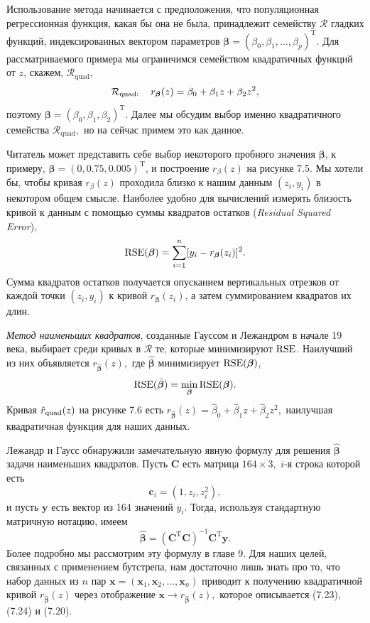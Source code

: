 Использование метода начинается с предположения, что популяционная регрессионная функция, какая бы она не была, принадлежит семейству $\mathcal R$ гладких функций, индексированных вектором параметров $\bm \beta = (\beta_0,\beta_1,\ldots,\beta_p)^\mathrm{T}$. Для рассматриваемого примера мы ограничимся семейством квадратичных функций от $z$, скажем, $\mathcal R_\text{quad},$
\begin{equation}
  \mathcal R_\text{quad: \quad} r_{\bm \beta}(z) = \beta_0 + \beta_1 z + \beta_2 z^2,
\end{equation}
поэтому $\bm \beta = (\beta_0,\beta_1,\beta_2)^\mathrm{T}$. Далее мы обсудим выбор именно квадратичного семейства $\mathcal R_\text{quad},$ но на сейчас примем это как данное.

Читатель может представить себе выбор некоторого пробного значения $\bm \beta$, к примеру, $\bm \beta = (0,0.75,0.005)^\mathrm{T}$, и построение $r_\beta(z)$ на рисунке 7.5. Мы хотели бы, чтобы кривая $r_\beta(z)$ проходила близко к нашим данным $(z_i, y_i)$ в некотором общем смысле. Наиболее удобно для вычислений измерять близость кривой к данным с помощью суммы квадратов остатков (\textit{Residual Squared Error}),
\begin{equation}
  \text{RSE}(\bm \beta) = \sum_{i = 1}^n [y_i - r_{\bm \beta} (z_i)]^2.
\end{equation}
Сумма квадратов остатков получается опусканием вертикальных отрезков от каждой точки $(z_i, y_i)$ к кривой $r_{\bm \beta} (z_i)$, а затем суммированием квадратов их длин.

\textit{Метод наименьших квадратов}, созданные Гауссом и Лежандром в начале 19 века, выбирает среди кривых в $\mathcal R$ те, которые минимизируют $\text{RSE}$. Наилучший из них объявляется $r_{\hat {\bm \beta}}(z),$ где $\hat {\bm\beta}$ минимизирует $\text{RSE}(\bm \beta)$,
\begin{equation}
  \text{RSE}(\hat{\bm \beta}) = \min_{\bm \beta}{\text{RSE}(\bm \beta)}.
\end{equation}
 Кривая $\hat{r}_{\text{quad}}(z)$ на рисунке 7.6 есть $r_{\hat{\bm \beta}}(z) = \hat \beta_0 + \hat \beta_1 z + \hat \beta_2 z^2,$ наилучшая квадратичная функция для наших данных.
 
 Лежандр и Гаусс обнаружили замечательную явную формулу для решения $\hat{\bm \beta}$ задачи наименьших квадратов. Пусть $\mathbf C$ есть матрица $164\times 3,$ $i$-я строка которой есть
 \begin{equation}
  \bm c_i = (1, z_i, z_i^2),
\end{equation}
и пусть $\mathbf y$ есть вектор из 164 значений $y_i.$ Тогда, используя стандартную матричную нотацию, имеем
\begin{equation}
  \hat{\bm \beta} = (\mathbf C^\mathrm{T} \mathbf{C})^{-1} \mathbf{C}^\mathrm{T} \mathbf y.
\end{equation}
Более  подробно мы рассмотрим эту формулу в главе 9. Для наших целей, связанных с применением бутстрепа, нам достаточно лишь знать про то, что набор данных из $n$ пар $\mathbf x = (\mathbf x_1, \mathbf x_2,\ldots, \mathbf x_n)$ приводит к получению квадратичной кривой $r_{\hat{\bm \beta}}(z)$ через отображение $\mathbf x \rightarrow r_{\hat{\bm \beta}}(z),$ которое описывается (7.23), (7.24) и (7.20).

